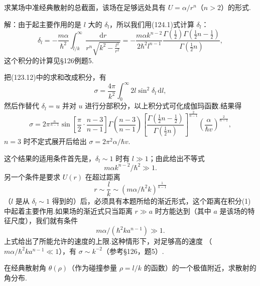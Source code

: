 \begin{xiti}

\quad 求某场中准经典散射的总截面，该场在足够远处具有 $U=\alpha/r^n$（$n>2$）的形式.

解：由于起主要作用的是 $l$ 大的 $\delta_l$，所以我们用(124.1)式计算 $\delta_l$：
\setcounter{equation}{0}\renewcommand{\theequation}{\arabic{equation}}%
\begin{equation}
  \delta_l=-\frac{m\alpha}{\hbar^2}\int_{l/k}^{\infty}
  \frac{\mathrm{d}r}{r^n\sqrt{k^2-\frac{l^2}{r^2}}}
  =-\frac{m\alpha k^{n-2}}{2\hbar^2 l^{n-1}}
  \frac{\Gamma\left(\frac{1}{2}\right)\Gamma\left(\frac{1}{2}n-\frac{1}{2}\right)}
  {\Gamma\left(\frac{1}{2}n\right)},
\end{equation}
这个积分的计算见§126例题5.

把(123.12)中的求和改成积分，有
\begin{equation*}
  \sigma=\frac{4\pi}{k^2}\int_0^{\infty}2l\sin^2\delta_l\,\mathrm{d}l,
\end{equation*}
然后作替代 $\delta_l=u$ 并对 $u$ 进行分部积分，以上积分式可化成伽玛函数.结果得
\begin{equation}
  \sigma=2\pi^{\frac{n}{n-1}}
  \sin\left[\frac{\pi}{2}\cdot\frac{n-3}{n-1}\right]
  \Gamma\left(\frac{n-3}{n-1}\right)
  \left[\frac{\Gamma\left(\frac{1}{2}n-\frac{1}{2}\right)}
  {\Gamma\left(\frac{1}{2}n\right)}\right]^{\frac{2}{n-1}}
  \left(\frac{\alpha}{\hbar v}\right)^{\frac{2}{n-1}},
\end{equation}
$n=3$ 时不定式展开后给出 $\sigma=2\pi^2\alpha/\hbar v$.

这个结果的适用条件首先是，$\delta_l\sim1$ 时有 $l\gg1$；由此给出不等式
\begin{equation*}
  m\alpha k^{n-2}/\hbar^2\gg1.
\end{equation*}
另一个条件是要求 $U(r)$ 在超过距离
\begin{equation*}
  r\sim\frac{l}{k}\sim(m\alpha/\hbar^2k)^{\frac{1}{n-1}}
\end{equation*}
（$l$ 是从 $\delta_l\sim1$ 得到的）后，必须具有本题所给的渐近形式，这个距离在积分(1)中起着主要作用.如果场的渐近式只当距离 $r\gg a$ 时方能达到（其中 $a$ 是该场的特征尺度），我们就有条件
\begin{equation*}
  m\alpha/(\hbar^2ka^{n-1})\gg1.
\end{equation*}
上式给出了所能允许的速度的上限.这种情形下，对足够高的速度
（$m\alpha/\hbar^2ka^{n-1}\ll1$），有 $\sigma\sim k^{-2}$（参考§126，题5）.

\quad 在经典散射角 $\theta(\rho)$（作为碰撞参量 $\rho=l/k$ 的函数）的一个极值附近，求散射的角分布.


\end{xiti}
